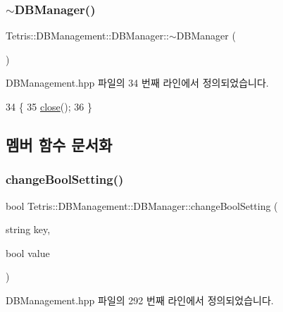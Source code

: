 \subsubsection{\texorpdfstring{$\sim$\+D\+B\+Manager()}{~DBManager()}}
{\footnotesize\ttfamily Tetris\+::\+D\+B\+Management\+::\+D\+B\+Manager\+::$\sim$\+D\+B\+Manager (\begin{DoxyParamCaption}{ }\end{DoxyParamCaption})\hspace{0.3cm}{\ttfamily [inline]}}



D\+B\+Management.\+hpp 파일의 34 번째 라인에서 정의되었습니다.


\begin{DoxyCode}
34                         \{
35                 \hyperlink{class_tetris_1_1_d_b_management_1_1_d_b_manager_a8390e6ddf3fa06e90fa5c2ab4997e5c1}{close}();
36             \}
\end{DoxyCode}


\subsection{멤버 함수 문서화}
\mbox{\label{class_tetris_1_1_d_b_management_1_1_d_b_manager_aece3390d5f2edca3f86316b903870c92}} 
\subsubsection{\texorpdfstring{change\+Bool\+Setting()}{changeBoolSetting()}}
{\footnotesize\ttfamily bool Tetris\+::\+D\+B\+Management\+::\+D\+B\+Manager\+::change\+Bool\+Setting (\begin{DoxyParamCaption}\item[{string}]{key,  }\item[{bool}]{value }\end{DoxyParamCaption})\hspace{0.3cm}{\ttfamily [inline]}}



D\+B\+Management.\+hpp 파일의 292 번째 라인에서 정의되었습니다.


